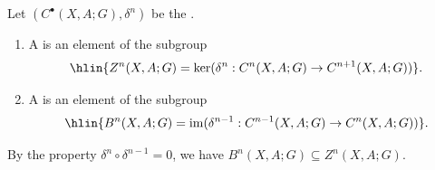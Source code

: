 \begin{definition} \label{definition:singular_n_cocycles_coboundaries_of_a_topological_space_with_coefficients_in_an_abelian_group}
Let $(C^\bullet(X, A; G), \delta^n)$ be the .

\begin{enumerate}
    \item A  is an element of the subgroup
    $$\hlin{Z^n(X, A; G) = \ker(\delta^n : C^n(X, A; G) \to C^{n+1}(X, A; G))}.$$
    
    \item A  is an element of the subgroup
    $$\hlin{B^n(X, A; G) = \operatorname{im}(\delta^{n-1} : C^{n-1}(X, A; G) \to C^n(X, A; G))}.$$
\end{enumerate}
By the property $\delta^n \circ \delta^{n-1} = 0$, we have $B^n(X, A; G) \subseteq Z^n(X, A; G)$.
\end{definition}